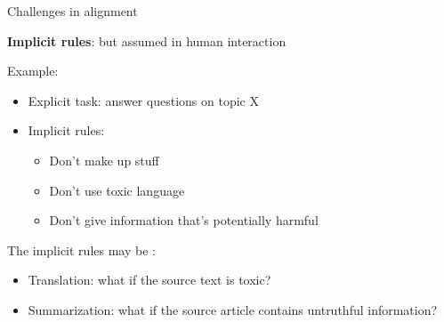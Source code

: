 \documentclass[usenames,dvipsnames,notes,11pt,aspectratio=169,hyperref={colorlinks=true, linkcolor=blue}]{beamer}
\begin{document}
\begin{frame}
    {Challenges in alignment}

    \textbf{Implicit rules}:  but assumed in human interaction

    Example:\\
    \begin{itemize}
        \item Explicit task: answer questions on topic X
        \item Implicit rules:
            \begin{itemize}
                \item Don't make up stuff
                \item Don't use toxic language
                \item Don't give information that's potentially harmful
            \end{itemize}
    \end{itemize}

    \pause
    The implicit rules may be :\\
    \begin{itemize}
        \item Translation: what if the source text is toxic?
        \item Summarization: what if the source article contains untruthful information?
    \end{itemize}
\end{frame}
\end{document}
